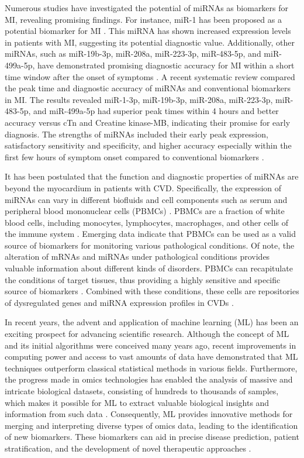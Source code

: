 \documentclass[sn-mathphys,Numbered]{sn-jnl}%
\theoremstyle{thmstyleone}%
\theoremstyle{thmstyletwo}%
\theoremstyle{thmstylethree}%
\begin{document}
Numerous studies have investigated the potential of miRNAs as biomarkers for MI, revealing promising findings. For instance, miR-1 has been proposed as a potential biomarker for MI \cite{new3}. This miRNA has shown increased expression levels in patients with MI, suggesting its potential diagnostic value. Additionally, other miRNAs, such as miR-19b-3p, miR-208a, miR-223-3p, miR-483-5p, and miR-499a-5p, have demonstrated promising diagnostic accuracy for MI within a short time window after the onset of symptoms \cite{new4}. A recent systematic review compared the peak time and diagnostic accuracy of miRNAs and conventional biomarkers in MI. The results revealed miR-1-3p, miR-19b-3p, miR-208a, miR-223-3p, miR-483-5p, and miR-499a-5p had superior peak times within 4 hours and better accuracy versus cTn and Creatine kinase-MB, indicating their promise for early diagnosis. The strengths of miRNAs included their early peak expression, satisfactory sensitivity and specificity, and higher accuracy especially within the first few hours of symptom onset compared to conventional biomarkers \cite{sys}.


It has been postulated that the function and diagnostic properties of miRNAs are beyond the myocardium in patients with CVD. Specifically, the expression of miRNAs can vary in different biofluids and cell components such as serum and peripheral blood mononuclear cells (PBMCs) \cite{36}. 
PBMCs are a fraction of white blood cells, including monocytes,
lymphocytes, macrophages, and other cells of the immune system \cite{PBMC-miR}. Emerging data indicate that PBMCs can be used as a valid
source of biomarkers for monitoring various pathological conditions. Of
note, the alteration of mRNAs and miRNAs under pathological conditions
provides valuable information about different kinds of disorders. PBMCs
can recapitulate the conditions of target tissues, thus providing a
highly sensitive and specific source of biomarkers \cite{Meder6}. Combined with these conditions, these cells are repositories of
dysregulated genes and miRNA expression profiles in CVDs \cite{PBMC-miR, Meder6}.

In recent years, the advent and application of machine learning (ML) has
been an exciting prospect for advancing scientific research. Although
the concept of ML and its initial algorithms were conceived many years
ago, recent improvements in computing power and access to vast amounts
of data have demonstrated that ML techniques outperform classical
statistical methods in various fields. Furthermore, the progress made in
omics technologies has enabled the analysis of massive and intricate
biological datasets, consisting of hundreds to thousands of samples,
which makes it possible for ML to extract valuable biological insights
and information from such data \cite{ML-Bio}. Consequently, ML
provides innovative methods for merging and interpreting diverse types
of omics data, leading to the identification of new biomarkers. These
biomarkers can aid in precise disease prediction, patient
stratification, and the development of novel therapeutic approaches
\cite{ML}.
\end{document}
